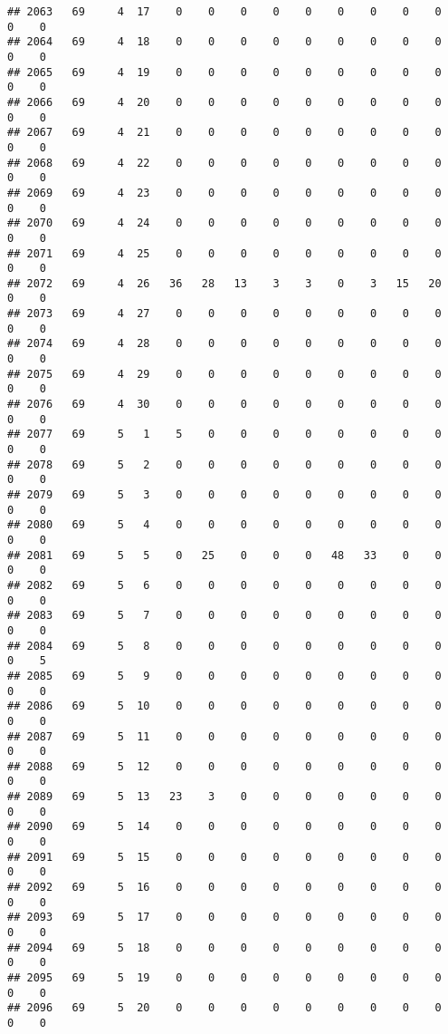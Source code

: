 \documentclass[]{article}
\begin{document}
\begin{verbatim}
## 2063   69     4  17    0    0    0    0    0    0    0    0    0    0    0
## 2064   69     4  18    0    0    0    0    0    0    0    0    0    0    0
## 2065   69     4  19    0    0    0    0    0    0    0    0    0    0    0
## 2066   69     4  20    0    0    0    0    0    0    0    0    0    0    0
## 2067   69     4  21    0    0    0    0    0    0    0    0    0    0    0
## 2068   69     4  22    0    0    0    0    0    0    0    0    0    0    0
## 2069   69     4  23    0    0    0    0    0    0    0    0    0    0    0
## 2070   69     4  24    0    0    0    0    0    0    0    0    0    0    0
## 2071   69     4  25    0    0    0    0    0    0    0    0    0    0    0
## 2072   69     4  26   36   28   13    3    3    0    3   15   20    0    0
## 2073   69     4  27    0    0    0    0    0    0    0    0    0    0    0
## 2074   69     4  28    0    0    0    0    0    0    0    0    0    0    0
## 2075   69     4  29    0    0    0    0    0    0    0    0    0    0    0
## 2076   69     4  30    0    0    0    0    0    0    0    0    0    0    0
## 2077   69     5   1    5    0    0    0    0    0    0    0    0    0    0
## 2078   69     5   2    0    0    0    0    0    0    0    0    0    0    0
## 2079   69     5   3    0    0    0    0    0    0    0    0    0    0    0
## 2080   69     5   4    0    0    0    0    0    0    0    0    0    0    0
## 2081   69     5   5    0   25    0    0    0   48   33    0    0    0    0
## 2082   69     5   6    0    0    0    0    0    0    0    0    0    0    0
## 2083   69     5   7    0    0    0    0    0    0    0    0    0    0    0
## 2084   69     5   8    0    0    0    0    0    0    0    0    0    0    5
## 2085   69     5   9    0    0    0    0    0    0    0    0    0    0    0
## 2086   69     5  10    0    0    0    0    0    0    0    0    0    0    0
## 2087   69     5  11    0    0    0    0    0    0    0    0    0    0    0
## 2088   69     5  12    0    0    0    0    0    0    0    0    0    0    0
## 2089   69     5  13   23    3    0    0    0    0    0    0    0    0    0
## 2090   69     5  14    0    0    0    0    0    0    0    0    0    0    0
## 2091   69     5  15    0    0    0    0    0    0    0    0    0    0    0
## 2092   69     5  16    0    0    0    0    0    0    0    0    0    0    0
## 2093   69     5  17    0    0    0    0    0    0    0    0    0    0    0
## 2094   69     5  18    0    0    0    0    0    0    0    0    0    0    0
## 2095   69     5  19    0    0    0    0    0    0    0    0    0    0    0
## 2096   69     5  20    0    0    0    0    0    0    0    0    0    0    0

\end{verbatim}
\end{document}
